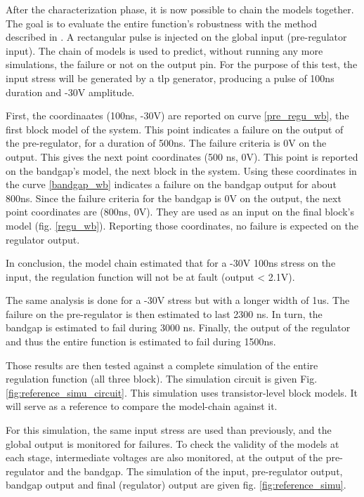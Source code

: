 After the characterization phase, it is now possible to chain the models together.
The goal is to evaluate the entire function's robustness with the method described in \label{sec:block-chaining}.
A rectangular pulse is injected on the global input (pre-regulator input).
The chain of models is used to predict, without running any more simulations, the failure or not on the output pin.
For the purpose of this test, the input stress will be generated by a \gls{tlp} generator, producing a pulse of 100ns duration and -30V amplitude.

First, the coordinaates (100ns, -30V) are reported on curve \ref{pre_regu_wb}, the first block model of the system.
This point indicates a failure on the output of the pre-regulator, for a duration of 500ns.
The failure criteria is 0V on the output.
This gives the next point coordinates (500 ns, 0V).
This point is reported on the bandgap's model, the next block in the system.
Using these coordinates in the curve \ref{bandgap_wb} indicates a failure on the bandgap output for about 800ns.
Since the failure criteria for the bandgap is 0V on the output, the next point coordinates are (800ns, 0V).
They are used as an input on the final block's model (fig. \ref{regu_wb}).
Reporting those coordinates, no failure is expected on the regulator output.

In conclusion, the model chain estimated that for a -30V 100ns stress on the input, the regulation function will not be at fault (output < 2.1V).

The same analysis is done for a -30V stress but with a longer width of 1us.
The failure on the pre-regulator is then estimated to last 2300 ns.
In turn, the bandgap is estimated to fail during 3000 ns.
Finally, the output of the regulator and thus the entire function is estimated to fail during 1500ns.

Those results are then tested against a complete simulation of the entire regulation function (all three block).
The simulation circuit is given Fig. \ref{fig:reference_simu_circuit}.
This simulation uses transistor-level block models.
It will serve as a reference to compare the model-chain against it.

For this simulation, the same input stress are used than previously, and the global output is monitored for failures.
To check the validity of the models at each stage, intermediate voltages are also monitored, at the output of the pre-regulator and the bandgap.
The simulation of the input, pre-regulator output, bandgap output and final (regulator) output are given fig. \ref{fig:reference_simu}.

